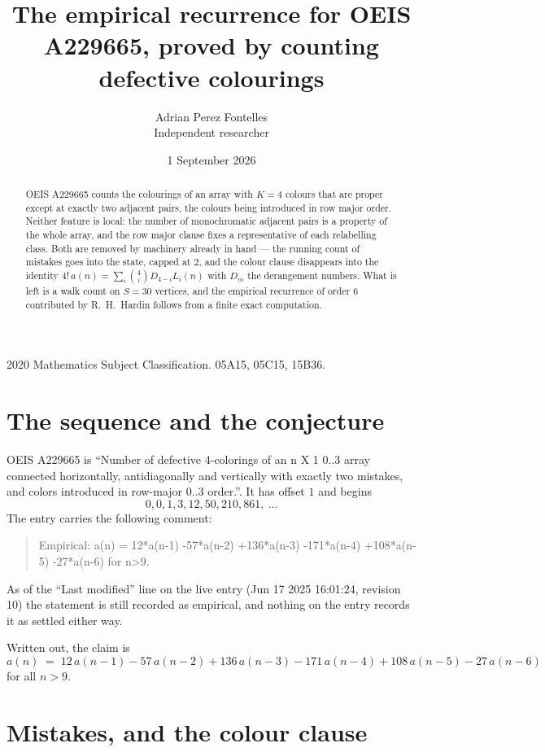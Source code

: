 \documentclass[11pt,a4paper]{article}
\title{The empirical recurrence for OEIS A229665, proved by counting defective colourings}
\author{Adrian Perez Fontelles\\ \small Independent researcher}
\date{1 September 2026}
\theoremstyle{plain}
\theoremstyle{definition}
\begin{document}
\maketitle

\begin{abstract}
OEIS A229665 counts the colourings of an array with $K=4$ colours that are proper except at
exactly two adjacent pairs, the colours being introduced in row
major order. Neither feature is local: the number of monochromatic adjacent pairs is a
property of the whole array, and the row major clause fixes a representative of each
relabelling class. Both are removed by machinery already in hand --- the running count of
mistakes goes into the state, capped at $2$, and the colour clause disappears into the
identity $4!\,a(n)=\sum_i\binom{4}{i}D_{4-i}L_i(n)$ with $D_m$ the derangement
numbers. What is left is a walk count on $S=30$ vertices, and the empirical recurrence of
order $6$ contributed by R.~H.~Hardin follows from a finite exact computation.
\end{abstract}

\noindent\small 2020 Mathematics Subject Classification. 05A15, 05C15, 15B36.\normalsize

\section{The sequence and the conjecture}

OEIS A229665 is ``Number of defective 4-colorings of an n X 1 0..3 array connected horizontally, antidiagonally and vertically with exactly two mistakes, and colors introduced in row-major 0..3 order.''. It has offset $1$ and begins
\[
0, 0, 1, 3, 12, 50, 210, 861,\ \dots
\]
The entry carries the following comment:
\begin{quote}\small
Empirical: a(n) = 12*a(n-1) -57*a(n-2) +136*a(n-3) -171*a(n-4) +108*a(n-5) -27*a(n-6) for n>9.
\end{quote}
As of the ``Last modified'' line on the live entry (Jun 17 2025 16:01:24, revision 10) the statement is
still recorded as empirical, and nothing on the entry records it as settled either way.

Written out, the claim is
\begin{equation}\label{eq:conj}
a(n)\;=\;12\,a(n-1) - 57\,a(n-2) + 136\,a(n-3) - 171\,a(n-4) + 108\,a(n-5) - 27\,a(n-6)
\end{equation}
for all $n>9$.

\section{Mistakes, and the colour clause}
\end{document}
